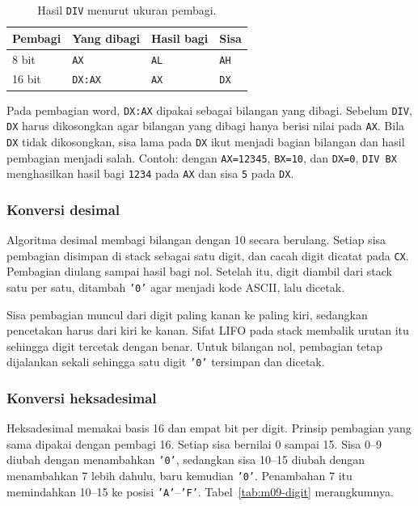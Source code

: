 \begin{table}[H]
    \centering
    \caption{Hasil \texttt{DIV} menurut ukuran pembagi.}
    \label{tab:m09-div}
    \small
    \begin{tabular}{@{}llll@{}}
        \toprule
        \textbf{Pembagi} & \textbf{Yang dibagi} &
        \textbf{Hasil bagi} & \textbf{Sisa} \\
        \midrule
        8 bit & \texttt{AX} & \texttt{AL} & \texttt{AH} \\
        16 bit & \texttt{DX:AX} & \texttt{AX} & \texttt{DX} \\
        \bottomrule
    \end{tabular}
\end{table}

Pada pembagian word, \texttt{DX:AX} dipakai sebagai bilangan yang
dibagi. Sebelum \texttt{DIV}, \texttt{DX} harus dikosongkan agar
bilangan yang dibagi hanya berisi nilai pada \texttt{AX}. Bila
\texttt{DX} tidak dikosongkan, sisa lama pada \texttt{DX} ikut
menjadi bagian bilangan dan hasil pembagian menjadi salah. Contoh:
dengan \texttt{AX=12345}, \texttt{BX=10}, dan \texttt{DX=0},
\texttt{DIV BX} menghasilkan hasil bagi \texttt{1234} pada
\texttt{AX} dan sisa \texttt{5} pada \texttt{DX}.

\subsubsection*{Konversi desimal}

Algoritma desimal membagi bilangan dengan 10 secara berulang. Setiap
sisa pembagian disimpan di stack sebagai satu digit, dan cacah digit
dicatat pada \texttt{CX}. Pembagian diulang sampai hasil bagi nol.
Setelah itu, digit diambil dari stack satu per satu, ditambah
\texttt{'0'} agar menjadi kode ASCII, lalu dicetak.

Sisa pembagian muncul dari digit paling kanan ke paling kiri,
sedangkan pencetakan harus dari kiri ke kanan. Sifat LIFO pada stack
membalik urutan itu sehingga digit tercetak dengan benar. Untuk
bilangan nol, pembagian tetap dijalankan sekali sehingga satu digit
\texttt{'0'} tersimpan dan dicetak.

\subsubsection*{Konversi heksadesimal}

Heksadesimal memakai basis 16 dan empat bit per digit. Prinsip
pembagian yang sama dipakai dengan pembagi 16. Setiap sisa bernilai
0 sampai 15. Sisa 0--9 diubah dengan menambahkan \texttt{'0'},
sedangkan sisa 10--15 diubah dengan menambahkan 7 lebih dahulu, baru
kemudian \texttt{'0'}. Penambahan 7 itu memindahkan 10--15 ke posisi
\texttt{'A'}--\texttt{'F'}. Tabel~\ref{tab:m09-digit} merangkumnya.

